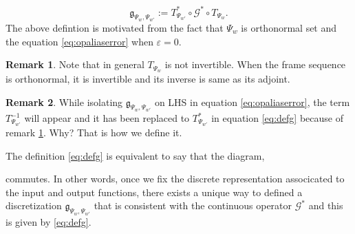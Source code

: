 \documentclass[reqno,10pt]{amsart}
\theoremstyle{plain}
\theoremstyle{definition}
\newtheorem{rem}{Remark}
\newcommand{\bb}[1]{\mathbb{#1}}
\newcommand{\cal}[1]{\mathcal{#1}}
\begin{document}
    \begin{equation}\label{eq:defg}
        \mathfrak{g}_{\Psi_w,\Psi_{w'}} := T^*_{\Psi_{w'}} \circ \cal G^* \circ T_{\Psi_w}.
    \end{equation}
    The above defintion is motivated from the fact that $\Psi_w$ is orthonormal set and the equation \ref{eq:opaliaserror} when $\varepsilon = 0$.
    \begin{rem}\label{rem:invert}
        Note that in general $T_{\Psi_w}$ is not invertible. When the frame sequence is orthonormal, it is invertible and its inverse is same as its adjoint.
    \end{rem}
    \begin{rem}
        While isolating $\mathfrak{g}_{\Psi_w,\Psi_{w'}}$ on LHS in equation \ref{eq:opaliaserror}, the term $T^{-1}_{\Psi_{w'}}$ will appear and it has been replaced to $T^*_{\Psi_{w'}}$ in equation \ref{eq:defg} because of remark \ref{rem:invert}. Why? That is how we define it. 
    \end{rem}
    \noindent The definition \ref{eq:defg} is equivalent to say that the diagram,
    \begin{figure}[!ht]
    \end{figure}
    commutes. In other words, once we fix the discrete representation associcated to the input and output functions, there exists a unique way to defined a discretization $\mathfrak{g}_{\Psi_w,\Psi_{w'}}$ that is consistent with the continuous operator $\cal G^*$ and this is given by \ref{eq:defg}.
\end{document}
